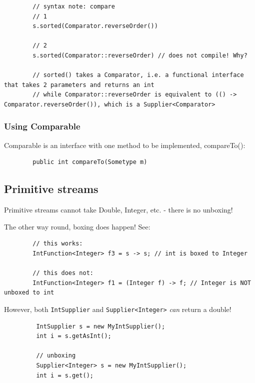 \documentclass{scrartcl}
\begin{document}
    \begin{lstlisting}
    \end{lstlisting}

    \begin{lstlisting}
        // syntax note: compare
        // 1
        s.sorted(Comparator.reverseOrder())

        // 2
        s.sorted(Comparator::reverseOrder) // does not compile! Why?

        // sorted() takes a Comparator, i.e. a functional interface that takes 2 parameters and returns an int
        // while Comparator::reverseOrder is equivalent to (() -> Comparator.reverseOrder()), which is a Supplier<Comparator>
    \end{lstlisting}

\subsubsection{Using Comparable}

    Comparable is an interface with one method to be implemented, compareTo():

    \begin{lstlisting}
        public int compareTo(Sometype m)
    \end{lstlisting}

\subsection{Primitive streams}

    Primitive streams cannot take Double, Integer, etc. - there is no unboxing!

    The other way round, boxing does happen! See:

    \begin{lstlisting}
        // this works:
        IntFunction<Integer> f3 = s -> s; // int is boxed to Integer

        // this does not:
        IntFunction<Integer> f1 = (Integer f) -> f; // Integer is NOT unboxed to int
    \end{lstlisting}

     However, both \lstinline|IntSupplier| and \lstinline|Supplier<Integer>| \textit{can} return a double!

      \begin{lstlisting}
         IntSupplier s = new MyIntSupplier();
         int i = s.getAsInt();

         // unboxing
         Supplier<Integer> s = new MyIntSupplier();
         int i = s.get();
     \end{lstlisting}
\end{document}
